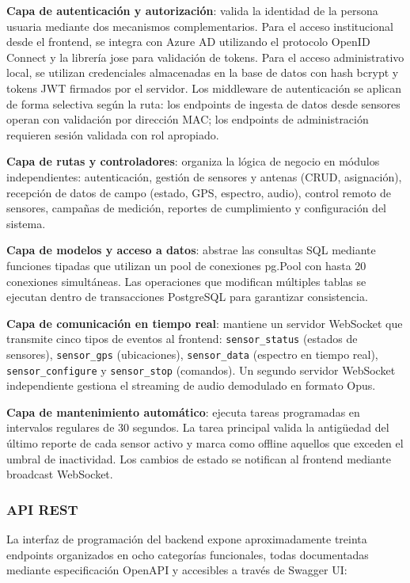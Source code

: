 \textbf{Capa de autenticación y autorización}: valida la identidad de la
persona usuaria mediante dos mecanismos complementarios. Para el acceso
institucional desde el frontend, se integra con Azure AD utilizando el
protocolo OpenID Connect y la librería jose para validación de tokens. Para el
acceso administrativo local, se utilizan credenciales almacenadas en la base
de datos con hash bcrypt y tokens JWT firmados por el servidor. Los middleware
de autenticación se aplican de forma selectiva según la ruta: los endpoints de
ingesta de datos desde sensores operan con validación por dirección MAC; los
endpoints de administración requieren sesión validada con rol apropiado.

\textbf{Capa de rutas y controladores}: organiza la lógica de negocio en
módulos independientes: autenticación, gestión de sensores y antenas (CRUD,
asignación), recepción de datos de campo (estado, GPS, espectro, audio),
control remoto de sensores, campañas de medición, reportes de cumplimiento y
configuración del sistema.

\textbf{Capa de modelos y acceso a datos}: abstrae las consultas SQL mediante
funciones tipadas que utilizan un pool de conexiones pg.Pool con hasta 20
conexiones simultáneas. Las operaciones que modifican múltiples tablas se
ejecutan dentro de transacciones PostgreSQL para garantizar consistencia.

\textbf{Capa de comunicación en tiempo real}: mantiene un servidor WebSocket
que transmite cinco tipos de eventos al frontend: \texttt{sensor\_status}
(estados de sensores), \texttt{sensor\_gps} (ubicaciones),
\texttt{sensor\_data} (espectro en tiempo real), \texttt{sensor\_configure} y
\texttt{sensor\_stop} (comandos). Un segundo servidor WebSocket independiente
gestiona el streaming de audio demodulado en formato Opus.

\textbf{Capa de mantenimiento automático}: ejecuta tareas programadas en
intervalos regulares de 30 segundos. La tarea principal valida la antigüedad
del último reporte de cada sensor activo y marca como offline aquellos que
exceden el umbral de inactividad. Los cambios de estado se notifican al
frontend mediante broadcast WebSocket.

\subsubsection*{API REST}

La interfaz de programación del backend expone aproximadamente treinta
endpoints organizados en ocho categorías funcionales, todas documentadas
mediante especificación OpenAPI y accesibles a través de Swagger UI:

